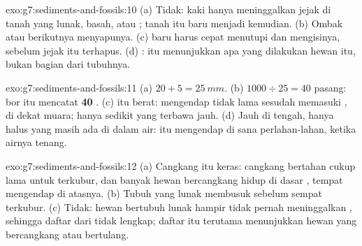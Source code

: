 \begin{solution}{exo:g7:sediments-and-fossils:10}
(a) Tidak: kaki hanya meninggalkan jejak di tanah yang lunak,  basah,
atau ; tanah itu baru menjadi  kemudian. (b) Ombak atau 
berikutnya menyapunya. (c)  baru harus cepat menutupi dan mengisinya,
sebelum jejak itu terhapus. (d) :  itu menunjukkan apa yang
dilakukan hewan itu, bukan bagian dari tubuhnya.
\end{solution}

\begin{solution}{exo:g7:sediments-and-fossils:11}
(a) $20 + 5 = \qty{25}{mm}$. (b) $1000 \div 25 = 40$ pasang:  bor itu
mencatat \textbf{40 }. (c)  itu berat:  mengendap tidak
lama sesudah  memasuki , di dekat muara; hanya sedikit yang
terbawa jauh. (d) Jauh di tengah, hanya  halus yang masih ada di
dalam air:  itu mengendap di sana perlahan-lahan, ketika airnya
tenang.
\end{solution}

\begin{solution}{exo:g7:sediments-and-fossils:12}
(a) Cangkang itu keras: cangkang bertahan cukup lama untuk terkubur, dan
banyak hewan bercangkang hidup di dasar , tempat  mengendap di
atasnya. (b) Tubuh yang lunak membusuk sebelum sempat terkubur. (c) Tidak:
hewan bertubuh lunak hampir tidak pernah meninggalkan , sehingga
daftar dari  tidak lengkap; daftar itu terutama menunjukkan hewan yang
bercangkang atau bertulang.
\end{solution}

